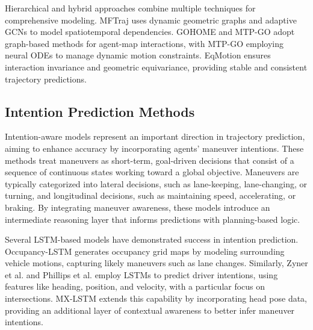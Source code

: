 Hierarchical and hybrid approaches combine multiple techniques for comprehensive modeling. MFTraj \cite{Liao2024MFTrajMB} uses dynamic geometric graphs and adaptive GCNs to model spatiotemporal dependencies. GOHOME \cite{10.1109/ICRA46639.2022.9812253} and MTP-GO \cite{Westny2023MTPGOGP} adopt graph-based methods for agent-map interactions, with MTP-GO employing neural ODEs to manage dynamic motion constraints. EqMotion \cite{10205349} ensures interaction invariance and geometric equivariance, providing stable and consistent trajectory predictions.

\subsection{Intention Prediction Methods}

Intention-aware models represent an important direction in trajectory prediction, aiming to enhance accuracy by incorporating agents’ maneuver intentions. These methods \cite{7487409, Deo2018HowWS} treat maneuvers as short-term, goal-driven decisions that consist of a sequence of continuous states working toward a global objective. Maneuvers are typically categorized into lateral decisions, such as lane-keeping, lane-changing, or turning, and longitudinal decisions, such as maintaining speed, accelerating, or braking. By integrating maneuver awareness, these models introduce an intermediate reasoning layer that informs predictions with planning-based logic.

Several LSTM-based models have demonstrated success in intention prediction. Occupancy-LSTM \cite{Kim2017ProbabilisticVT} generates occupancy grid maps by modeling surrounding vehicle motions, capturing likely maneuvers such as lane changes. Similarly, Zyner et al. \cite{10.1109/IVS.2017.7995919} and Phillips et al. \cite{Phillips2017GeneralizableIP} employ LSTMs to predict driver intentions, using features like heading, position, and velocity, with a particular focus on intersections. MX-LSTM \cite{Hasan2018MXLSTMMT} extends this capability by incorporating head pose data, providing an additional layer of contextual awareness to better infer maneuver intentions.
